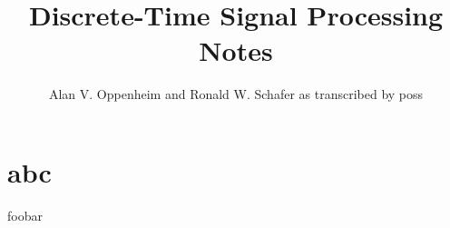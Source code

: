 \documentclass{article}
\title{Discrete-Time Signal Processing Notes}
\author{Alan V. Oppenheim and Ronald W. Schafer as transcribed by poss}
\begin{document}
\maketitle{}

\section{abc}

foobar
\end{document}
